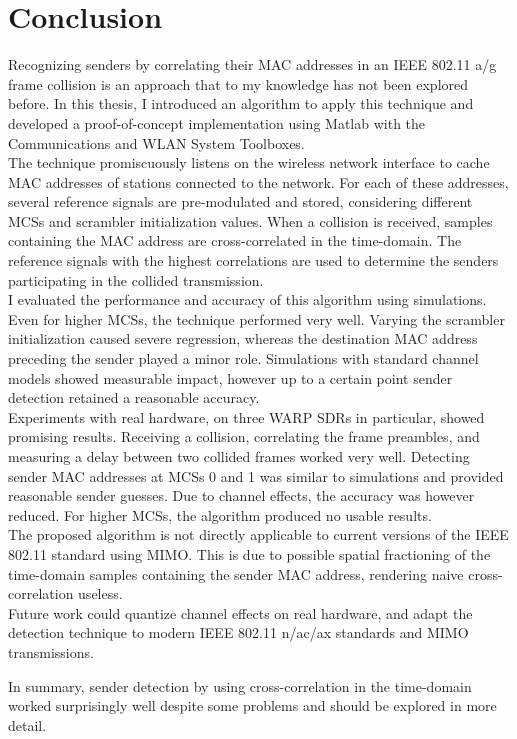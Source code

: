 
\chapter{Conclusion}\label{ch:Conclusion}
\glsresetall %

Recognizing senders by correlating their \gls{MAC} addresses in an IEEE 802.11 a/g frame collision is an approach that to my knowledge has not been explored before. In this thesis, I introduced an algorithm to apply this technique and developed a proof-of-concept implementation using Matlab with the Communications and WLAN System Toolboxes.\\

The technique promiscuously listens on the wireless network interface to cache \gls{MAC} addresses of stations connected to the network. For each of these addresses, several reference signals are pre-modulated and stored, considering different \glspl{MCS} and scrambler initialization values. When a collision is received, samples containing the \gls{MAC} address are cross-correlated in the time-domain. The reference signals with the highest correlations are used to determine the senders participating in the collided transmission.\\

I evaluated the performance and accuracy of this algorithm using simulations. Even for higher \glspl{MCS}, the technique performed very well. Varying the scrambler initialization caused severe regression, whereas the destination \gls{MAC} address preceding the sender played a minor role. Simulations with standard channel models showed measurable impact, however up to a certain point sender detection retained a reasonable accuracy.\\

Experiments with real hardware, on three \gls{WARP} \glspl{SDR} in particular, showed promising results. Receiving a collision, correlating the frame preambles, and measuring a delay between two collided frames worked very well. Detecting sender \gls{MAC} addresses at \glspl{MCS} 0 and 1 was similar to simulations and provided reasonable sender guesses. Due to channel effects, the accuracy was however reduced. For higher \glspl{MCS}, the algorithm produced no usable results.\\

The proposed algorithm is not directly applicable to current versions of the IEEE 802.11 standard using \gls{MIMO}. This is due to possible spatial fractioning of the time-domain samples containing the sender \gls{MAC} address, rendering naive cross-correlation useless.\\

Future work could quantize channel effects on real hardware, and adapt the detection technique to modern IEEE 802.11 n/ac/ax standards and \gls{MIMO} transmissions.

In summary, sender detection by using cross-correlation in the time-domain worked surprisingly well despite some problems and should be explored in more detail.
